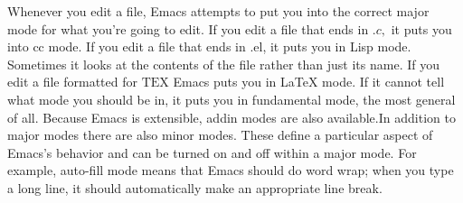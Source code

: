 \documentclass[12pt]{book}
\begin{document}
Whenever you edit a file, Emacs attempts to put you into the correct major mode for what you're going to edit. If you edit a file that ends in $. c,$ it puts you into cc mode. If you edit a file that ends in .el, it puts you in Lisp mode. Sometimes it looks at the contents of the file rather than just its name. If you edit a file formatted for $\mathrm{TEX}$ Emacs puts you in LaTeX mode. If it cannot tell what mode you should be in, it puts you in fundamental mode, the most general of all. Because Emacs is extensible, addin modes are also available.In addition to major modes there are also minor modes. These define a particular aspect of Emacs's behavior and can be turned on and off within a major mode. For example, auto-fill mode means that Emacs should do word wrap; when you type a long line, it should automatically make an appropriate line break.
\end{document}
